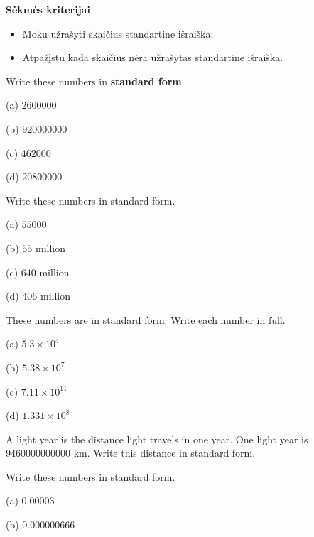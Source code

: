 \begin{multicols}{2}
  \columnseprule=0.4pt
\textbf{Sėkmės kriterijai}
\begin{itemize}
  \item Moku užrašyti skaičius standartine išraiška;
  \item Atpažįstu kada skaičius nėra užrašytas standartine išraiška.
\end{itemize}


\begin{uzd}
Write these numbers in \textbf{standard form}.
\resetcolumnrule
\begin{multicols}{2}
(a) $2 600 000$  

(b) $920000000$  

(c) $462000$  

(d) $20800000$
\end{multicols}
\end{uzd}


\begin{uzd}
Write these numbers in standard form.
\resetcolumnrule
\begin{multicols}{2}
(a) $55000$  

(b) $55$ million  

(c) $640$ million  

(d) $406$ million
\end{multicols}
\end{uzd}


\begin{uzd}
These numbers are in standard form. Write each number in full.
\resetcolumnrule
\begin{multicols}{2}
(a) $5.3 \times 10^4$  

(b) $5.38 \times 10^7$  

(c) $7.11 \times 10^{11}$  

(d) $1.331 \times 10^8$
\end{multicols}
\end{uzd}


\begin{uzd}
A light year is the distance light travels in one year.  
One light year is $9460000000000$ km.  
Write this distance in standard form.
\end{uzd}


\begin{uzd}
Write these numbers in standard form.
\resetcolumnrule
\begin{multicols}{2}
(a) $0.00003$  

(b) $0.000000666$  


\end{multicols}
\end{uzd}
\end{multicols}
